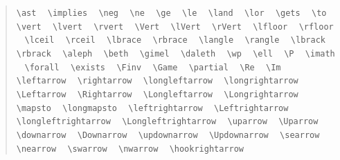 \documentclass{article}
\newcommand{\texcommand}[1]{\textbackslash{}#1}
\newcommand{\spacer}{\,\,\, \hfil}
\newenvironment{mylist}{\begin{quote}}{\end{quote}}
\begin{document}
\begin{mylist}
\texttt{\texcommand{ast}} \spacer
\texttt{\texcommand{implies}} \spacer
\texttt{\texcommand{neg}} \spacer 
\texttt{\texcommand{ne}} \spacer 
\texttt{\texcommand{ge}} \spacer 
\texttt{\texcommand{le}} \spacer 
\texttt{\texcommand{land}} \spacer 
\texttt{\texcommand{lor}} \spacer 
\texttt{\texcommand{gets}} \spacer 
\texttt{\texcommand{to}} \spacer 
\texttt{\texcommand{vert}} \spacer 
\texttt{\texcommand{lvert}} \spacer 
\texttt{\texcommand{rvert}} \spacer 
\texttt{\texcommand{Vert}} \spacer 
\texttt{\texcommand{lVert}} \spacer 
\texttt{\texcommand{rVert}} \spacer 
\texttt{\texcommand{lfloor}} \spacer 
\texttt{\texcommand{rfloor}} \spacer 
\texttt{\texcommand{lceil}} \spacer 
\texttt{\texcommand{rceil}} \spacer 
\texttt{\texcommand{lbrace}} \spacer 
\texttt{\texcommand{rbrace}} \spacer 
\texttt{\texcommand{langle}} \spacer 
\texttt{\texcommand{rangle}} \spacer 
\texttt{\texcommand{lbrack}} \spacer 
\texttt{\texcommand{rbrack}} \spacer 
\texttt{\texcommand{aleph}} \spacer 
\texttt{\texcommand{beth}} \spacer 
\texttt{\texcommand{gimel}} \spacer 
\texttt{\texcommand{daleth}} \spacer 
\texttt{\texcommand{wp}} \spacer 
\texttt{\texcommand{ell}} \spacer 
\texttt{\texcommand{P}} \spacer 
\texttt{\texcommand{imath}} \spacer 
\texttt{\texcommand{forall}} \spacer 
\texttt{\texcommand{exists}} \spacer 
\texttt{\texcommand{Finv}} \spacer 
\texttt{\texcommand{Game}} \spacer 
\texttt{\texcommand{partial}} \spacer 
\texttt{\texcommand{Re}} \spacer 
\texttt{\texcommand{Im}} \spacer 
\texttt{\texcommand{leftarrow}} \spacer 
\texttt{\texcommand{rightarrow}} \spacer 
\texttt{\texcommand{longleftarrow}} \spacer 
\texttt{\texcommand{longrightarrow}} \spacer 
\texttt{\texcommand{Leftarrow}} \spacer 
\texttt{\texcommand{Rightarrow}} \spacer 
\texttt{\texcommand{Longleftarrow}} \spacer 
\texttt{\texcommand{Longrightarrow}} \spacer 
\texttt{\texcommand{mapsto}} \spacer 
\texttt{\texcommand{longmapsto}} \spacer 
\texttt{\texcommand{leftrightarrow}} \spacer 
\texttt{\texcommand{Leftrightarrow}} \spacer 
\texttt{\texcommand{longleftrightarrow}} \spacer 
\texttt{\texcommand{Longleftrightarrow}} \spacer 
\texttt{\texcommand{uparrow}} \spacer 
\texttt{\texcommand{Uparrow}} \spacer 
\texttt{\texcommand{downarrow}} \spacer 
\texttt{\texcommand{Downarrow}} \spacer 
\texttt{\texcommand{updownarrow}} \spacer 
\texttt{\texcommand{Updownarrow}} \spacer 
\texttt{\texcommand{searrow}} \spacer 
\texttt{\texcommand{nearrow}} \spacer 
\texttt{\texcommand{swarrow}} \spacer 
\texttt{\texcommand{nwarrow}} \spacer 
\texttt{\texcommand{hookrightarrow}} \spacer 

\end{mylist}
\end{document}

